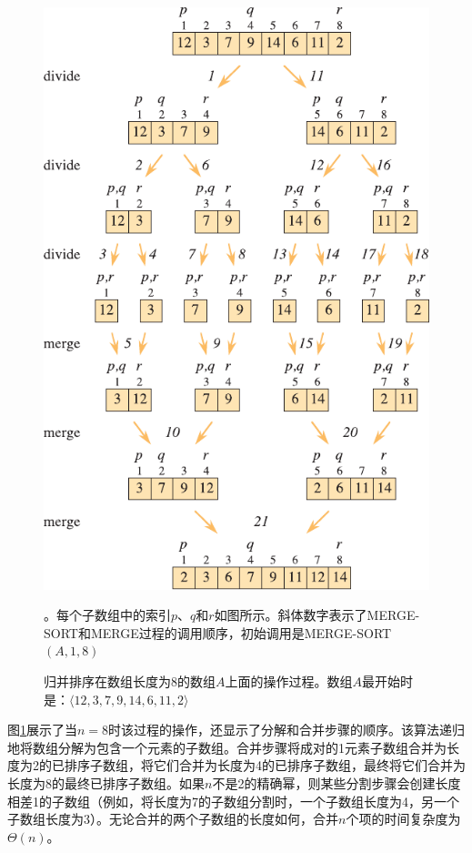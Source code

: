 \documentclass[lang=cn,newtx,10pt,scheme=chinese]{elegantbook}
\begin{document}
\begin{figure}[htbp]
    \centering
    \includegraphics{算法导论第四版插图/第二章/归并排序完整过程示意图.pdf}
    \caption{归并排序在数组长度为8的数组$A$上面的操作过程。数组$A$最开始时是：$\langle{12,3,7,9,14,6,11,2}\rangle$}。每个子数组中的索引$p$、$q$和$r$如图所示。斜体数字表示了MERGE-SORT和MERGE过程的调用顺序，初始调用是MERGE-SORT$(A,1,8)$
    \label{fig:归并排序完整过程示意图}
\end{figure}

图\ref{fig:归并排序完整过程示意图}展示了当$n=8$时该过程的操作，还显示了分解和合并步骤的顺序。该算法递归地将数组分解为包含一个元素的子数组。合并步骤将成对的1元素子数组合并为长度为2的已排序子数组，将它们合并为长度为4的已排序子数组，最终将它们合并为长度为8的最终已排序子数组。如果$n$不是2的精确幂，则某些分割步骤会创建长度相差1的子数组（例如，将长度为7的子数组分割时，一个子数组长度为4，另一个子数组长度为3）。无论合并的两个子数组的长度如何，合并$n$个项的时间复杂度为$\Theta(n)$。
\end{document}
